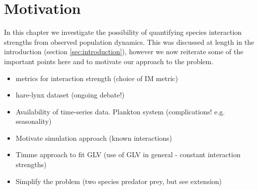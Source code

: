 



\section{Motivation}
\label{sec:motivate_interactions}
In this chapter we investigate the possibility of quantifying species interaction strengths from observed population dynamics. This was discussed at length in the introduction (section \ref{sec:introduction}), however we now reiterate some of the important points here and to motivate our approach to the problem.


\begin{itemize}
	\item metrics for interaction strength (choice of IM metric)
	\item hare-lynx dataset (ongoing debate!)
	\item Availability of time-series data. Plankton system (complications! e.g. seasonality)
	\item Motivate simulation approach (known interactions)
	\item Timme approach to fit GLV (use of GLV in general - constant interaction strengths)
	\item Simplify the problem (two species predator prey, but see extension)
\end{itemize}

